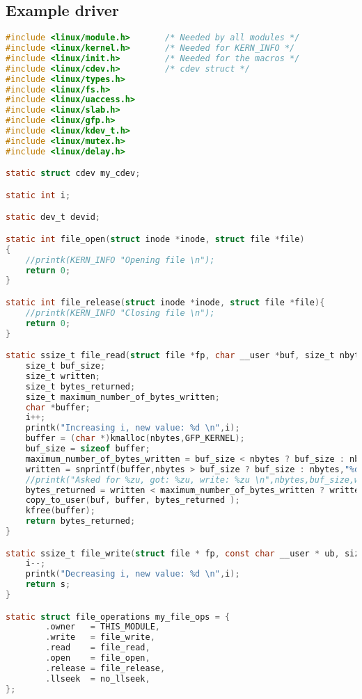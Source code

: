 \documentclass[..thesis.tex]{subfiles}
\begin{document}
\subsection{Example driver}

\label{A:example-driver}
\begin{lstlisting}[language=C,style=def]
#include <linux/module.h>       /* Needed by all modules */
#include <linux/kernel.h>       /* Needed for KERN_INFO */
#include <linux/init.h>         /* Needed for the macros */
#include <linux/cdev.h>         /* cdev struct */
#include <linux/types.h>
#include <linux/fs.h>
#include <linux/uaccess.h>
#include <linux/slab.h>
#include <linux/gfp.h>
#include <linux/kdev_t.h>
#include <linux/mutex.h>
#include <linux/delay.h>

static struct cdev my_cdev;

static int i;

static dev_t devid;

static int file_open(struct inode *inode, struct file *file)
{
    //printk(KERN_INFO "Opening file \n");
    return 0;
}

static int file_release(struct inode *inode, struct file *file){
    //printk(KERN_INFO "Closing file \n");
    return 0;
}

static ssize_t file_read(struct file *fp, char __user *buf, size_t nbytes, loff_t *pointer){
    size_t buf_size;
    size_t written;
    size_t bytes_returned;
    size_t maximum_number_of_bytes_written;
    char *buffer;
    i++;
    printk("Increasing i, new value: %d \n",i);
    buffer = (char *)kmalloc(nbytes,GFP_KERNEL);
    buf_size = sizeof buffer;
    maximum_number_of_bytes_written = buf_size < nbytes ? buf_size : nbytes;
    written = snprintf(buffer,nbytes > buf_size ? buf_size : nbytes,"%d%c",i,'\n');
    //printk("Asked for %zu, got: %zu, write: %zu \n",nbytes,buf_size,written);
    bytes_returned = written < maximum_number_of_bytes_written ? written : maximum_number_of_bytes_written;
    copy_to_user(buf, buffer, bytes_returned );
    kfree(buffer);
    return bytes_returned;
}

static ssize_t file_write(struct file * fp, const char __user * ub, size_t s, loff_t *pointer){
    i--;
    printk("Decreasing i, new value: %d \n",i);
    return s;
}

static struct file_operations my_file_ops = {
        .owner   = THIS_MODULE,
        .write   = file_write,
        .read    = file_read,
        .open    = file_open,
        .release = file_release,
        .llseek  = no_llseek,
};


\end{lstlisting}
\end{document}

